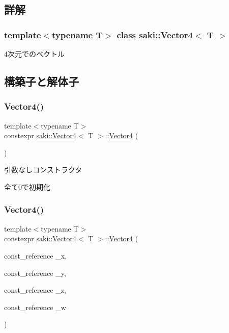 \subsection{詳解}
\subsubsection*{template$<$typename T$>$\newline
class saki\+::\+Vector4$<$ T $>$}

4次元でのベクトル 

\subsection{構築子と解体子}
\mbox{\label{classsaki_1_1_vector4_a9e8579274314ee2639d60c501c8ecf61}} 
\subsubsection{\texorpdfstring{Vector4()}{Vector4()}\hspace{0.1cm}{\footnotesize\ttfamily [1/5]}}
{\footnotesize\ttfamily template$<$typename T$>$ \\
constexpr \mbox{\hyperlink{classsaki_1_1_vector4}{saki\+::\+Vector4}}$<$ T $>$\+::\mbox{\hyperlink{classsaki_1_1_vector4}{Vector4}} (\begin{DoxyParamCaption}{ }\end{DoxyParamCaption})\hspace{0.3cm}{\ttfamily [inline]}}



引数なしコンストラクタ 

全て0で初期化 \mbox{\label{classsaki_1_1_vector4_a0f448af7e8a95317faaeb2eddc34f953}} 
\subsubsection{\texorpdfstring{Vector4()}{Vector4()}\hspace{0.1cm}{\footnotesize\ttfamily [2/5]}}
{\footnotesize\ttfamily template$<$typename T$>$ \\
constexpr \mbox{\hyperlink{classsaki_1_1_vector4}{saki\+::\+Vector4}}$<$ T $>$\+::\mbox{\hyperlink{classsaki_1_1_vector4}{Vector4}} (\begin{DoxyParamCaption}\item[{const\+\_\+reference}]{\+\_\+x,  }\item[{const\+\_\+reference}]{\+\_\+y,  }\item[{const\+\_\+reference}]{\+\_\+z,  }\item[{const\+\_\+reference}]{\+\_\+w }\end{DoxyParamCaption})\hspace{0.3cm}{\ttfamily [inline]}}



